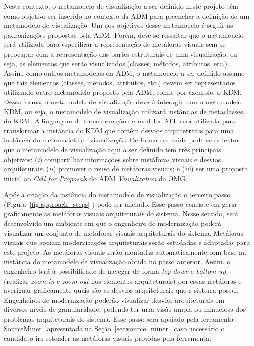 \documentclass[12pt]{article}
\begin{document}
Neste contexto, o metamodelo de visualização a ser definido neste projeto têm como objetivo ser inserido no contexto da ADM para preencher a definição de um metamodelo de visualização. Um dos objetivos desse metamodelo é seguir as padronizações propostas pela ADM. Porém, deve-se ressaltar que o metamodelo será utilizado para especificar a representação de metáforas visuais sem se preocupar com a representação das partes estruturais de uma visualização, ou seja, os elementos que serão visualizados (classes, métodos, atributos, etc.). Assim, como outros metamodelos da ADM, o metamodelo a ser definido assume que tais elementos (classes, métodos, atributos, etc.) devem ser representados utilizando outro metamodelo proposto pela ADM, como, por exemplo, o KDM. Dessa forma, o metamodelo de visualização deverá interagir com o metamodelo KDM, ou seja, o metamodelo de visualização utilizará instâncias de metaclasses do KDM. A linguagem de transformação de modelos ATL será utilizada para transformar a instância do KDM que contêm desvios arquiteturais para uma instância do metamodelo de visualização.  De forma resumida pode-se salientar que o metamodelo de visualização aqui a ser definido têm três principais objetivos: (\textit{i}) compartilhar informações sobre metáforas visuais e desvios arquiteturais; (\textit{ii}) promover o reuso de metáforas visuais; e (\textit{iii}) ser uma proposta inicial ao \textit{Call for Proposals} do ADM \textit{Visualization} da OMG. 

Após a criação da instância do metamodelo de visualização o terceiro passo (Figura~\ref{fig:approach_steps} ) pode ser iniciado. Esse passo consiste em gerar graficamente as metáforas visuais arquiteturais do sistema. Nesse sentido, será desenvolvido um ambiente em que o engenheiro de modernização poderá visualizar um conjunto de metáforas visuais arquiteturais do sistema. Metáforas visuais que apoiam modernizações arquiteturais serão estudadas e adaptadas para este projeto. As metáforas visuais serão montadas automaticamente com base na instância do metamodelo de visualização obtida no passo anterior. Assim, o engenheiro terá a possibilidade de navegar de forma \textit{top-down} e \textit{bottom-up} (realizar \textit{zoom in} e \textit{zoom out} nos elementos arquiteturais) por essas metáforas e averiguar graficamente quais são os desvios arquiteturais que o sistema possui. Engenheiros de modernização poderão visualizar desvios arquiteturais em diversos níveis de granularidade, podendo ter uma visão ampla ou minuciosa dos problemas arquiteturais do sistema. Esse passo será apoiado pela ferramenta SourceMiner~\cite{source_miner_glauco} apresentada na Seção~\ref{sec:source_miner}, caso necessário o candidato irá estender as metáforas visuais providas pela ferramenta.
\end{document}

